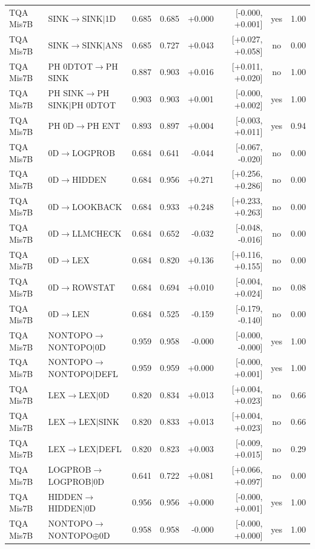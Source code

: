\begin{longtable}{llrrrrcc}
TQA Mis7B & SINK$\to$SINK$\mid$1D & 0.685 & 0.685 & +0.000 & [-0.000, +0.001] & yes & 1.00 \\
TQA Mis7B & SINK$\to$SINK$\mid$ANS & 0.685 & 0.727 & +0.043 & [+0.027, +0.058] & no & 0.00 \\
TQA Mis7B & PH 0DTOT$\to$PH SINK & 0.887 & 0.903 & +0.016 & [+0.011, +0.020] & no & 1.00 \\
TQA Mis7B & PH SINK$\to$PH SINK$\mid$PH 0DTOT & 0.903 & 0.903 & +0.001 & [-0.000, +0.002] & yes & 1.00 \\
TQA Mis7B & PH 0D$\to$PH ENT & 0.893 & 0.897 & +0.004 & [-0.003, +0.011] & yes & 0.94 \\
TQA Mis7B & 0D$\to$LOGPROB & 0.684 & 0.641 & -0.044 & [-0.067, -0.020] & no & 0.00 \\
TQA Mis7B & 0D$\to$HIDDEN & 0.684 & 0.956 & +0.271 & [+0.256, +0.286] & no & 0.00 \\
TQA Mis7B & 0D$\to$LOOKBACK & 0.684 & 0.933 & +0.248 & [+0.233, +0.263] & no & 0.00 \\
TQA Mis7B & 0D$\to$LLMCHECK & 0.684 & 0.652 & -0.032 & [-0.048, -0.016] & no & 0.00 \\
TQA Mis7B & 0D$\to$LEX & 0.684 & 0.820 & +0.136 & [+0.116, +0.155] & no & 0.00 \\
TQA Mis7B & 0D$\to$ROWSTAT & 0.684 & 0.694 & +0.010 & [-0.004, +0.024] & no & 0.08 \\
TQA Mis7B & 0D$\to$LEN & 0.684 & 0.525 & -0.159 & [-0.179, -0.140] & no & 0.00 \\
TQA Mis7B & NONTOPO$\to$NONTOPO$\mid$0D & 0.959 & 0.958 & -0.000 & [-0.000, -0.000] & yes & 1.00 \\
TQA Mis7B & NONTOPO$\to$NONTOPO$\mid$DEFL & 0.959 & 0.959 & +0.000 & [-0.000, +0.001] & yes & 1.00 \\
TQA Mis7B & LEX$\to$LEX$\mid$0D & 0.820 & 0.834 & +0.013 & [+0.004, +0.023] & no & 0.66 \\
TQA Mis7B & LEX$\to$LEX$\mid$SINK & 0.820 & 0.833 & +0.013 & [+0.004, +0.023] & no & 0.66 \\
TQA Mis7B & LEX$\to$LEX$\mid$DEFL & 0.820 & 0.823 & +0.003 & [-0.009, +0.015] & no & 0.29 \\
TQA Mis7B & LOGPROB$\to$LOGPROB$\mid$0D & 0.641 & 0.722 & +0.081 & [+0.066, +0.097] & no & 0.00 \\
TQA Mis7B & HIDDEN$\to$HIDDEN$\mid$0D & 0.956 & 0.956 & +0.000 & [-0.000, +0.001] & yes & 1.00 \\
TQA Mis7B & NONTOPO$\to$NONTOPO$\oplus$0D & 0.958 & 0.958 & -0.000 & [-0.000, +0.000] & yes & 1.00 \\

\end{longtable}
